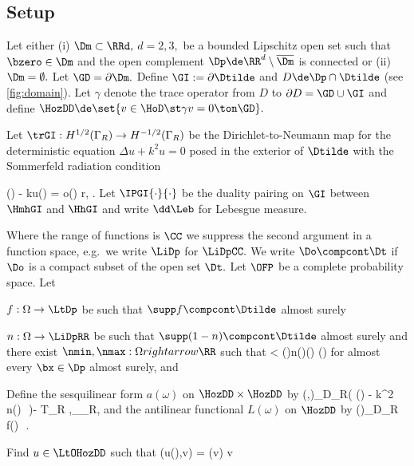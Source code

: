 \subsection{Setup}
Let either (i) $\Dm \subset \RRd,$ $d=2,3,$ be a bounded Lipschitz open set such that $\bzero \in \Dm$ and the open complement $\Dp\de \RR^d\setminus \overline{\Dm}$ is connected or (ii) $\Dm = \emptyset.$ Let $\GD = \partial \Dm.$ 
 Define $\GI := \partial \Dtilde$ and $D \de \Dp \cap \Dtilde$ (see \cref{fig:domain}). Let $\gamma$ denote the trace operator from $D$ to $\partial D = \GD \cup \GI$ and define $\HozDD \de \set{v \in \HoD \st \gamma v = 0 \ton \GD}.$ 
 
Let $\trGI: H^{1/2}(\Gamma_R) \rightarrow H^{-1/2}(\Gamma_R)$ be the Dirichlet-to-Neumann map for the deterministic equation $\Delta u+k^2 u=0$ posed in the exterior of $\Dtilde$ with the Sommerfeld radiation condition 

\beq
{}(\bx) - \ii ku(\bx) = o\mleft(\mright)  r\de\abs{\bx}\rightarrow \infty,  \frac{\bx}{\abs{\bx}}.
\eeq
Let $\IPGI{\cdot}{\cdot}$ be the duality pairing on $\GI$ between $\HmhGI$ and $\HhGI$ and write $\dd\Leb$ for Lebesgue measure.

 Where the range of functions is $\CC$ we suppress the second argument in a function space, e.g.~we write $\LiDp$ for $\LiDpCC.$ We write $\Do \compcont \Dt$ if $\Do$ is a compact subset of the open set $\Dt.$ Let $\OFP$ be a complete probability space. Let
\bit
\item $f:\Omega\rightarrow\LtDp$ be such that $\supp f \compcont \Dtilde$ almost surely
\item $n:\Omega\rightarrow \LiDpRR$ be such that $\supp(1-n) \compcont \Dtilde$ almost surely and there exist $\nmin,\nmax :\Omega rightarrow \RR$ such that
 < \nmin(\omega)\leq n(\omega)(\bx) \leq \nmax(\omega)
\eeqs
for almost every $\bx \in \Dp$ almost surely, and
\eit

Define the sesquilinear form $a(\omega)$ on $\HozDD \times \HozDD$ by
\beq
{}\mleft(\vo,\vt\mright)\de\int_{D_R}\Big( \mleft(\grad \vo\mright)\cdot \grad \vtb 
 - k^2 n(\omega)\, \vo\,\vtb \Big)\dd\Leb- \big\langle T_R \gamma \vo,\gamma \vt\big\rangle_{\Gamma_R},
 \eeq
 and the antilinear functional $L(\omega)$ on $\HozDD$ by
\beq
{}(\vt)\de \int_{D_R} f(\omega)\, \vtb\,\dd\Leb.
\eeq

Find $u\in\LtOHozDD$ such that
\beqs
{}\mleft(u(\omega),v\mright) = (v) \tfa v \in \HozDD {}
\eeqs

